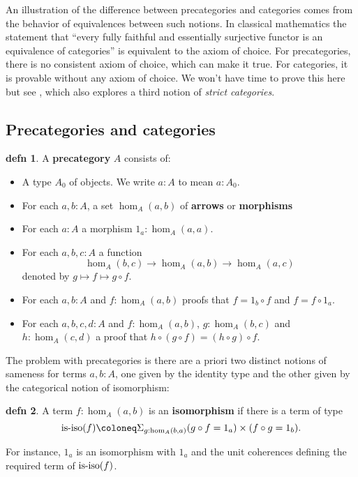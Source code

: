 \documentclass{amsart}
\theoremstyle{theorem}
\theoremstyle{definition}
\newtheorem*{defn}{defn}
\theoremstyle{remark}
\newcommand{\0}{\mathbbe{0}}
\newcommand{\1}{\mathbbe{1}}
\newcommand{\2}{\mathbbe{2}}
\newcommand{\3}{\mathbbe{3}}
\newcommand{\4}{\mathbbe{4}}
\newcommand{\type}[1]{{\textup{#1}}}
\newcommand{\is}[1]{\type{is-{#1}}}
\begin{document}
An illustration of the difference between precategories and categories comes from the behavior of equivalences between such notions. In classical mathematics the statement that ``every fully faithful and essentially surjective functor is an equivalence of categories'' is equivalent to the axiom of choice. For precategories, there is no consistent axiom of choice, which can make it true. For categories, it is provable without any axiom of choice. We won't have time to prove this here but see \cite[\S 9.4]{book-hott}, which also explores a third notion of \emph{strict categories}.


\subsection*{Precategories and categories}

\begin{defn} A \textbf{precategory} $A$ consists of:
\begin{itemize}
\item A type $A_0$ of objects. We write $a : A$ to mean $a : A_0$.
\item For each $a, b : A$, a set $\hom_A(a,b)$ of \textbf{arrows} or \textbf{morphisms}
\item For each $a :A$ a morphism $1_a : \hom_A(a,a)$.
\item For each $a,b,c : A$ a function
\[ \hom_A(b,c) \to \hom_A(a,b) \to \hom_A(a,c)\] denoted by $g \mapsto f \mapsto g \circ f$.
\item For each $a, b :A$ and $f : \hom_A(a,b)$ proofs that $f = 1_b \circ f$ and $f = f \circ 1_a$.
\item For each $a,b,c,d : A$ and $f : \hom_A(a,b)$, $g : \hom_A(b,c)$ and $h : \hom_A(c,d)$ a proof that $h \circ (g \circ f) = (h \circ g) \circ f$.
\end{itemize}
\end{defn}

The problem with precategories is there are a priori two distinct notions of sameness for terms $a,b :A$, one given by the identity type and the other given by the categorical notion of isomorphism:

\begin{defn} A term $f : \hom_A(a,b)$ is an \textbf{isomorphism} if there is a term of type
\[ \is{iso}(f) \coloneq \Sigma_{g: \hom_A(b,a)} (g \circ f= 1_a) \times (f \circ g = 1_b).\]
\end{defn}

For instance, $1_a$ is an isomorphism with $1_a$ and the unit coherences defining the required term of $\is{iso}(f)$.
\end{document}
